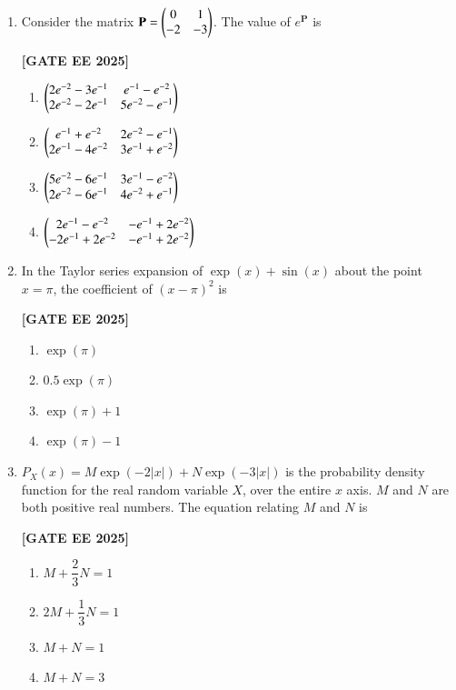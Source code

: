 \documentclass[12pt]{article}
\begin{document}
\begin{enumerate}[leftmargin=*, label=\textbf{Q.\arabic*:}]
\item Consider the matrix $\mathbf{P} = \begin{pmatrix} 0 & 1 \\ -2 & -3 \end{pmatrix}$. The value of $e^{\mathbf{P}}$ is
 
\noindent \textbf{[GATE EE 2025]}
\begin{multicols}{2}
\begin{enumerate}
    \item $\begin{pmatrix} 2e^{-2} - 3e^{-1} & e^{-1} - e^{-2} \\ 2e^{-2} - 2e^{-1} & 5e^{-2} - e^{-1}\end{pmatrix}$
    \item $\begin{pmatrix} e^{-1} + e^{-2} & 2e^{-2} - e^{-1} \\ 2e^{-1} - 4e^{-2} & 3e^{-1} + e^{-2} \end{pmatrix}$
    \item $\begin{pmatrix} 5e^{-2} - 6e^{-1} & 3e^{-1} - e^{-2} \\ 2e^{-2} - 6e^{-1} & 4e^{-2} + e^{-1} \end{pmatrix}$
    \item $\begin{pmatrix} 2e^{-1} - e^{-2} & -e^{-1} + 2e^{-2} \\ -2e^{-1} + 2e^{-2} & -e^{-1} + 2e^{-2} \end{pmatrix}$
\end{enumerate}
\end{multicols}

\item In the Taylor series expansion of $\exp(x) + \sin(x)$ about the point $x = \pi$, the coefficient of $(x - \pi)^2$ is
 
\noindent \textbf{[GATE EE 2025]}
\begin{multicols}{4}
\begin{enumerate}
    \item $\exp(\pi)$
    \item $0.5 \exp(\pi)$
    \item $\exp(\pi) + 1$
    \item $\exp(\pi) - 1$
\end{enumerate}
\end{multicols}

\item $P_X(x) = M\exp(-2|x|) + N\exp(-3|x|)$ is the probability density function for the real random variable $X$, over the entire $x$ axis. $M$ and $N$ are both positive real numbers. The equation relating $M$ and $N$ is
 
\noindent \textbf{[GATE EE 2025]}
\begin{multicols}{4}
\begin{enumerate}
    \item $M + \dfrac{2}{3} N = 1$
    \item $2M + \dfrac{1}{3}N = 1$
    \item $M + N = 1$
    \item $M + N = 3$
\end{enumerate}
\end{multicols}


\end{enumerate}
\end{document}
